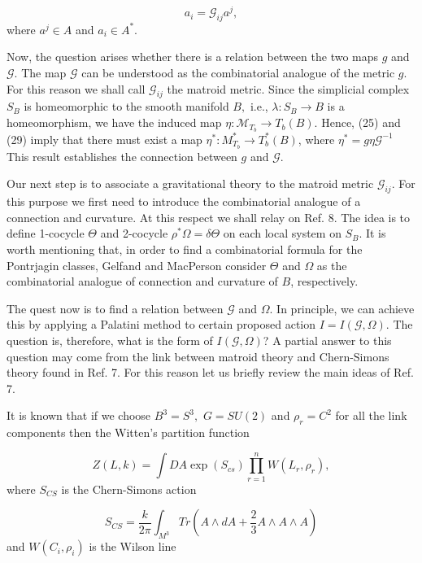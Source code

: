 \documentclass[a4paper,12pt]{article}
\begin{document}
\begin{equation}
a_{i}=\mathcal{G}_{ij}a^{j},  \label{30}
\end{equation}
where $a^{j}\in A$ and $a_{i}\in A^{\ast }$.

Now, the question arises whether there is a relation between the two maps $g$
and $\mathcal{G}$. The map $\mathcal{G}$ can be understood as the
combinatorial analogue of the metric $g$. For this reason we shall call $%
\mathcal{G}_{ij}$ the matroid metric. Since the simplicial complex $S_{B}$
is homeomorphic to the smooth manifold $B,$ i.e., $\lambda :S_{B}\rightarrow
B$ is a homeomorphism, we have the induced map $\eta :\mathcal{M}%
_{T_{b}}\rightarrow T_{b}(B)$. Hence, (25) and (29) imply that there must
exist a map $\eta ^{\ast }:M_{T_{b}}^{\ast }\rightarrow T_{b}^{\ast }(B)$,
where $\eta ^{\ast }=g\eta \mathcal{G}^{-1}$ This result establishes the
connection between $g$ and $\mathcal{G}$.

Our next step is to associate a gravitational theory to the matroid metric $%
\mathcal{G}_{ij}$. For this purpose we first need to introduce the
combinatorial analogue of a connection and curvature. At this respect we
shall relay on Ref. 8. The idea is to define 1-cocycle $\Theta $ and
2-cocycle $\rho ^{\ast }\Omega =\delta \Theta $ on each local system on $%
S_{B}$. It is worth mentioning that, in order to find a combinatorial
formula for the Pontrjagin classes, Gelfand and MacPerson consider $\Theta $
and $\Omega $ as the combinatorial analogue of connection and curvature of $%
B $, respectively.

The quest now is to find a relation between $\mathcal{G}$ and $\Omega $. In
principle, we can achieve this by applying a Palatini method to certain
proposed action $I=I(\mathcal{G},\Omega ).$ The question is, therefore, what
is the form of $I(\mathcal{G},\Omega )$? A partial answer to this question
may come from the link between matroid theory and Chern-Simons theory found
in Ref. 7. For this reason let us briefly review the main ideas of Ref. 7.

It is known that if we choose $B^{3}=S^{3},$ $G=SU(2)$ and $\rho _{r}=C^{2}$
for all the link components then the Witten's partition function

\begin{equation}
Z(L,k)=\int DA\exp (S_{cs})\prod\limits_{r=1}^{n}W(L_{r},\rho _{r}),
\label{31}
\end{equation}
where $S_{CS}$ is the Chern-Simons action

\begin{equation}
S_{CS}=\frac{k}{2\pi }\int_{M^{3}}Tr(A\wedge dA+\frac{2}{3}A\wedge A\wedge A)
\label{32}
\end{equation}
and $W(C_{i},\rho _{i})$ is the Wilson line
\end{document}

